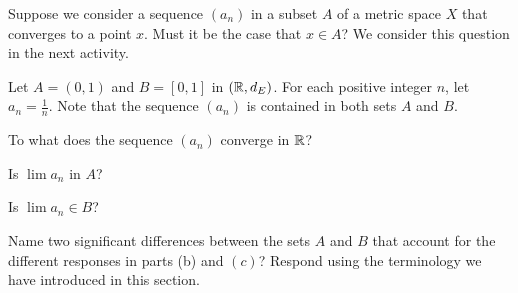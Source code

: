 \begin{comment}

\ActivitySolution

\ba
\item Since $x \in \overline{A} \cap \overline{X \setminus A}$, it is the case that $x \in \overline{A}$ and $x \in \overline{X \setminus A}$.

\item 
	\begin{enumerate}[i.]
	\item Suppose $x \in A$. Then $N$ contains a point, namely $x$, in $A$. Now $x \notin X \setminus A$ and $x \in \overline{X \setminus A}$ means that $N$ contains a point in $X \setminus A$ different from $x$. So $N$ contains a point in $A$ and a point in $X \setminus A$, which implies $x \in \Bdry(A)$. 
	
	\item Suppose $x \notin A$. Then $N$ contains a point, namely $x$, in $X \setminus A$. Now $x \notin A$ and $x \in \overline{A}$ means that $N$ contains a point in $A$ different from $x$. So $N$ contains a point in $A$ and a point in $X \setminus A$, which implies $x \in \Bdry(A)$. 
		
	\item In either case we have $x \in \Bdry(A)$ and so $\overline{A} \cap \overline{X \setminus A} \subseteq \Bdry(A)$. The two containments show that $\Bdry(A) = \overline{A} \cap \overline{X \setminus A}$.

		
	\end{enumerate}

\ea

\end{comment}


Suppose we consider a sequence $(a_n)$ in a subset $A$ of a metric space $X$ that converges to a point $x$. Must it be the case that $x \in A$? We consider this question in the next activity. 

\begin{activity} \label{act:closed_limitpoints} Let $A = (0,1)$ and $B = [0,1]$ in $(\mathbb{R}, d_E)$. For each positive integer $n$, let $a_n =\frac{1}{n}$. Note that the sequence $(a_n)$ is contained in both sets $A$ and $B$.
\ba
\item To what does the sequence $(a_n)$ converge in $\mathbb{R}$?   

\item Is $\lim a_n$ in $A$? 

\item Is $\lim a_n \in B$?

\item Name two significant differences between the sets $A$ and $B$ that account for the different responses in parts (b) and $(c)$? Respond using the terminology we have introduced in this section. 

\ea

\end{activity}

